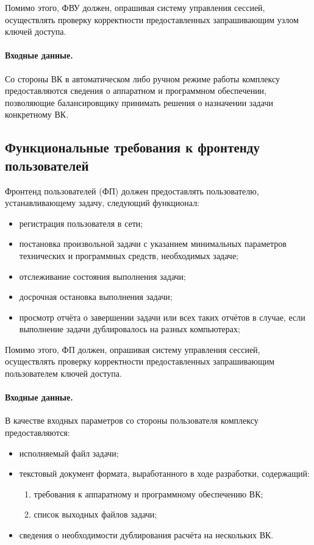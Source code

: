 \documentclass[a4paper,12pt]{report}
\numberwithin{equation}{section}
\begin{document}
Помимо этого, ФВУ должен, опрашивая систему управления сессией, осуществлять проверку корректности предоставленных запрашивающим узлом ключей доступа.

\paragraph{Входные данные.}
Со стороны ВК в автоматическом либо ручном режиме работы комплексу предоставляются сведения о аппаратном и программном обеспечении, 
позволяющие балансировщику принимать решения о назначении задачи конкретному ВК.

\subsection{Функциональные требования к фронтенду пользователей}
Фронтенд пользователей (ФП) должен предоставлять пользователю, устанавливающему задачу, следующий функционал:

\begin{itemize}
    \item регистрация пользователя в сети;
    \item постановка произвольной задачи с указанием минимальных параметров технических и программных средств, необходимых задаче;
    \item отслеживание состояния выполнения задачи;
    \item досрочная остановка выполнения задачи;
    \item просмотр отчёта о завершении задачи или всех таких отчётов в случае, если выполнение задачи дублировалось на разных компьютерах;
\end{itemize}
Помимо этого, ФП должен, опрашивая систему управления сессией, осуществлять проверку корректности предоставленных запрашивающим пользователем ключей доступа.


\paragraph{Входные данные.}
В качестве входных параметров со стороны пользователя комплексу предоставляются:
\begin{itemize}
    \item исполняемый файл задачи;
    \item текстовый документ формата, выработанного в ходе разработки, содержащий: 
    \begin{enumerate}
        \item требования к аппаратному и программному обеспечению ВК;
        \item список выходных файлов задачи;
    \end{enumerate}
    \item сведения о необходимости дублирования расчёта на нескольких ВК.
\end{itemize}
\end{document}
